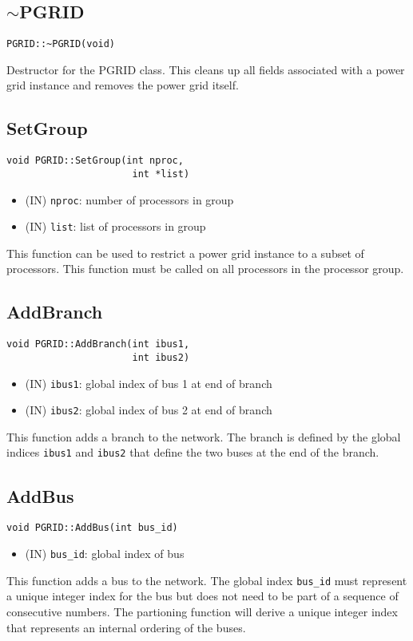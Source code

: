 \documentclass[12pt]{article}
\begin{document}
\subsection{$\sim$PGRID}
\begin{verbatim}
PGRID::~PGRID(void)
\end{verbatim}
Destructor for the PGRID class. This cleans up all fields associated with a
power grid instance and removes the power grid itself.
\subsection{SetGroup}
\begin{verbatim}
void PGRID::SetGroup(int nproc,
                      int *list)
\end{verbatim}
\begin{itemize}
\item (IN) \texttt{nproc}: number of processors in group
\item (IN) \texttt{list}: list of processors in group
\end{itemize}
This function can be used to restrict a power grid instance to a subset of
processors. This function must be called on all processors in the processor
group.

\subsection{AddBranch}
\begin{verbatim}
void PGRID::AddBranch(int ibus1,
                      int ibus2)
\end{verbatim}
\begin{itemize}
\item (IN) \texttt{ibus1}: global index of bus 1 at end of branch
\item (IN) \texttt{ibus2}: global index of bus 2 at end of branch
\end{itemize}
This function adds a branch to the network.  The branch is defined by the global
indices \texttt{ibus1} and \texttt{ibus2} that define the two buses at the
end of the branch.
\subsection{AddBus}
\begin{verbatim}
void PGRID::AddBus(int bus_id)
\end{verbatim}
\begin{itemize}
\item (IN) \texttt{bus\_id}: global index of bus
\end{itemize}
This function adds a bus to the network. The global index \texttt{bus\_id}
must represent a unique integer index for the bus but does not need to be part
of a sequence of consecutive numbers. The partioning function will derive a
unique integer index that represents an internal ordering of the buses.
\end{document}
